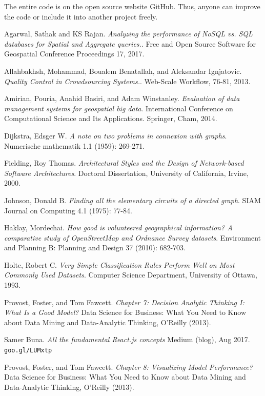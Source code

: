 \documentclass[sigconf]{acmart}
\begin{document}
The entire code is on the open source website GitHub. Thus, anyone can improve the code or include it into another project freely.

\begin{thebibliography}{9}
\bibitem{} 
Agarwal, Sathak and KS Rajan. 
\textit{Analyzing the performance of NoSQL vs. SQL databases for Spatial and Aggregate queries.}. 
Free and Open Source Software for Geospatial Conference Proceedings 17, 2017.
 
\bibitem{} 
Allahbakhsh, Mohammad, Boualem Benatallah, and Aleksandar Ignjatovic.
\textit{Quality Control in Crowdsourcing Systems.}.
Web-Scale Workflow, 76-81, 2013.

\bibitem{} 
Amirian, Pouria, Anahid Basiri, and Adam Winstanley.
\textit{Evaluation of data management systems for geospatial big data}.
International Conference on Computational Science and Its Applications. Springer, Cham, 2014.

\bibitem{} 
Dijkstra, Edsger W.
\textit{A note on two problems in connexion with graphs}.
Numerische mathematik 1.1 (1959): 269-271.

\bibitem{} 
Fielding, Roy Thomas.
\textit{Architectural Styles and the Design of Network-based Software Architectures}.
Doctoral Dissertation, University of California, Irvine, 2000.

\bibitem{} 
Johnson, Donald B.
\textit{Finding all the elementary circuits of a directed graph}.
SIAM Journal on Computing 4.1 (1975): 77-84.

\bibitem{} 
Haklay, Mordechai.
\textit{How good is volunteered geographical information? A comparative study of OpenStreetMap and Ordnance Survey datasets}.
Environment and Planning B: Planning and Design 37 (2010): 682-703.

\bibitem{} 
Holte, Robert C.
\textit{Very Simple Classification Rules Perform Well on Most Commonly Used Datasets}.
Computer Science Department, University of Ottawa, 1993.

\bibitem{} 
Provost, Foster, and Tom Fawcett.
\textit{Chapter 7: Decision Analytic Thinking I: What Is a Good Model?}
Data Science for Business: What You Need to Know about Data Mining and Data-Analytic Thinking, O'Reilly (2013).

\bibitem{} 
Samer Buna.
\textit{All the fundamental React.js concepts}
Medium (blog), Aug 2017.
\\\texttt{goo.gl/LUMxtp}

\bibitem{} 
Provost, Foster, and Tom Fawcett.
\textit{Chapter 8: Visualizing Model Performance?}
Data Science for Business: What You Need to Know about Data Mining and Data-Analytic Thinking, O'Reilly (2013).


\end{thebibliography}
\end{document}
